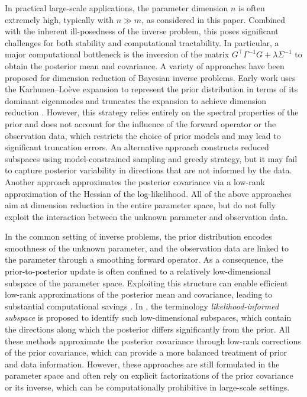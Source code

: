 \documentclass[]{myarticle}
\begin{document}
In practical large-scale applications, the parameter dimension $n$ is often extremely high, typically with $n \gg m$, as considered in this paper. Combined with the inherent ill-posedness of the inverse problem, this poses significant challenges for both stability and computational tractability. In particular, a major computational bottleneck is the inversion of the matrix $G^\top\Gamma^{-1}G+\lambda\Sigma^{-1}$ to obtain the posterior mean and covariance. A variety of approaches have been proposed for dimension reduction of Bayesian inverse problems. Early work uses the Karhunen--Lo\`eve expansion \cite{karhunen1947lineare,Loeve1978} to represent the prior distribution in terms of its dominant eigenmodes and truncates the expansion to achieve dimension reduction \cite{li2006efficient,marzouk2009dimensionality}. However, this strategy relies entirely on the spectral properties of the prior and does not account for the influence of the forward operator or the observation data, which restricts the choice of prior models and may lead to significant truncation errors. An alternative approach \cite{lieberman2010parameter} constructs reduced subspaces using model-constrained sampling and greedy strategy, but it may fail to capture posterior variability in directions that are not informed by the data. Another approach \cite{flath2011fast} approximates the posterior covariance via a low-rank approximation of the Hessian of the log-likelihood. All of the above approaches aim at dimension reduction in the entire parameter space, but do not fully exploit the interaction between the unknown parameter and observation data.

In the common setting of inverse problems, the prior distribution encodes smoothness of the unknown parameter, and the observation data are linked to the parameter through a smoothing forward operator. As a consequence, the prior-to-posterior update is often confined to a relatively low-dimensional subspace of the parameter space. Exploiting this structure can enable efficient low-rank approximations of the posterior mean and covariance, leading to substantial computational savings \cite{martin2012stochastic,bui2012extreme,bui2013computational}. In \cite{cui2014likelihood,spantini2015optimal}, the terminology \emph{likelihood-informed subspace} is proposed to identify such low-dimensional subspaces, which contain the directions along which the posterior differs significantly from the prior. All these methods approximate the posterior covariance through low-rank corrections of the prior covariance, which can provide a more balanced treatment of prior and data information. However, these approaches are still formulated in the parameter space and often rely on explicit factorizations of the prior covariance or its inverse, which can be computationally prohibitive in large-scale settings.
\end{document}
